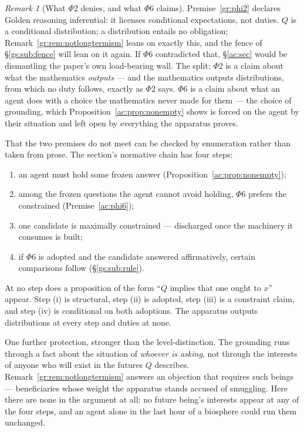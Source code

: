 \documentclass[11pt]{article}
\numberwithin{equation}{section}
\theoremstyle{plain}
\theoremstyle{definition}
\theoremstyle{remark}
\newtheorem{remark}[theorem]{Remark}
\begin{document}
\begin{remark}[What $\Phi2$ denies, and what $\Phi6$ claims]\label{ac:rem:phi2split}
Premise~\ref{gr:phi2} declares Golden reasoning inferential: it licenses conditional expectations, not duties. $Q$ is a conditional distribution; a distribution entails no obligation; Remark~\ref{gr:rem:notlongtermism} leans on exactly this, and the fence of \S\ref{gs:sub:fence} will lean on it again. If $\Phi6$ contradicted that, \S\ref{ac:sec} would be dismantling the paper's own load-bearing wall. The split: $\Phi2$ is a claim about what the mathematics \emph{outputs} --- and the mathematics outputs distributions, from which no duty follows, exactly as $\Phi2$ says. $\Phi6$ is a claim about what an agent does with a choice the mathematics never made for them --- the choice of grounding, which Proposition~\ref{ac:prop:nonempty} shows is forced on the agent by their situation and left open by everything the apparatus proves.

That the two premises do not meet can be checked by enumeration rather than taken from prose. The section's normative chain has four steps:
\begin{enumerate}[label=(\roman*)]
    \item an agent must hold some frozen answer (Proposition~\ref{ac:prop:nonempty});
    \item among the frozen questions the agent cannot avoid holding, $\Phi6$ prefers the constrained (Premise~\ref{ac:phi6});
    \item one candidate is maximally constrained --- discharged once the machinery it consumes is built;
    \item if $\Phi6$ is adopted and the candidate answered affirmatively, certain comparisons follow (\S\ref{gs:sub:rule}).
\end{enumerate}
At no step does a proposition of the form ``$Q$ implies that one ought to $x$'' appear. Step (i) is structural, step (ii) is adopted, step (iii) is a constraint claim, and step (iv) is conditional on both adoptions. The apparatus outputs distributions at every step and duties at none.

One further protection, stronger than the level-distinction. The grounding runs through a fact about the situation of \emph{whoever is asking}, not through the interests of anyone who will exist in the futures $Q$ describes. Remark~\ref{gr:rem:notlongtermism} answers an objection that requires such beings --- beneficiaries whose weight the apparatus stands accused of smuggling. Here there are none in the argument at all: no future being's interests appear at any of the four steps, and an agent alone in the last hour of a biosphere could run them unchanged.


\end{remark}
\end{document}
